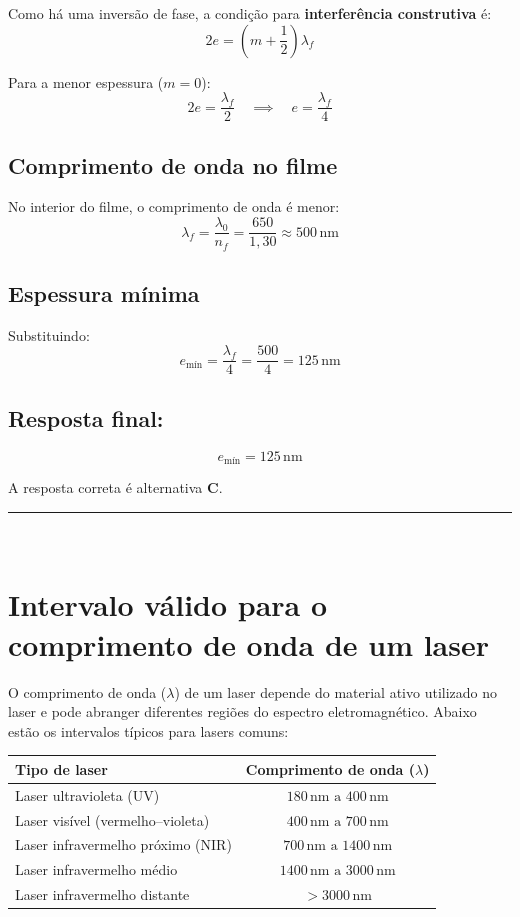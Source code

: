 \documentclass[a4paper,12pt]{article}
\begin{document}
\begin{flushleft}
Como há uma inversão de fase, a condição para \textbf{interferência construtiva} é:
\[
2e = \left(m + \frac{1}{2}\right) \lambda_f
\]

Para a menor espessura (\(m = 0\)):
\[
2e = \frac{\lambda_f}{2} \quad \implies \quad e = \frac{\lambda_f}{4}
\]

\subsection*{Comprimento de onda no filme}

No interior do filme, o comprimento de onda é menor:
\[
\lambda_f = \frac{\lambda_0}{n_f} = \frac{650}{1{,}30} \approx 500\,\mathrm{nm}
\]

\subsection*{Espessura mínima}

Substituindo:
\[
e_\text{mín} = \frac{\lambda_f}{4} = \frac{500}{4} = 125\,\mathrm{nm}
\]

\subsection*{Resposta final:}
\[
\boxed{e_\text{mín} = 125\,\mathrm{nm}}
\]


A resposta correta é alternativa \colorbox{green!50}{\textbf{C}}.
\end{flushleft}

\noindent\rule{\linewidth}{0.6pt}\\

\section*{Intervalo válido para o comprimento de onda de um laser}

O comprimento de onda (\( \lambda \)) de um laser depende do material ativo utilizado no laser e pode abranger diferentes regiões do espectro eletromagnético. Abaixo estão os intervalos típicos para lasers comuns:

\begin{center}
\begin{tabular}{|l|c|}
\hline
\textbf{Tipo de laser} & \textbf{Comprimento de onda (\( \lambda \))} \\
\hline
Laser ultravioleta (UV) & \(180\,\mathrm{nm} \text{ a } 400\,\mathrm{nm}\) \\
\hline
Laser visível (vermelho–violeta) & \(400\,\mathrm{nm} \text{ a } 700\,\mathrm{nm}\) \\
\hline
Laser infravermelho próximo (NIR) & \(700\,\mathrm{nm} \text{ a } 1400\,\mathrm{nm}\) \\
\hline
Laser infravermelho médio & \(1400\,\mathrm{nm} \text{ a } 3000\,\mathrm{nm}\) \\
\hline
Laser infravermelho distante & \(>3000\,\mathrm{nm}\) \\
\hline
\end{tabular}
\end{center}
\end{document}
